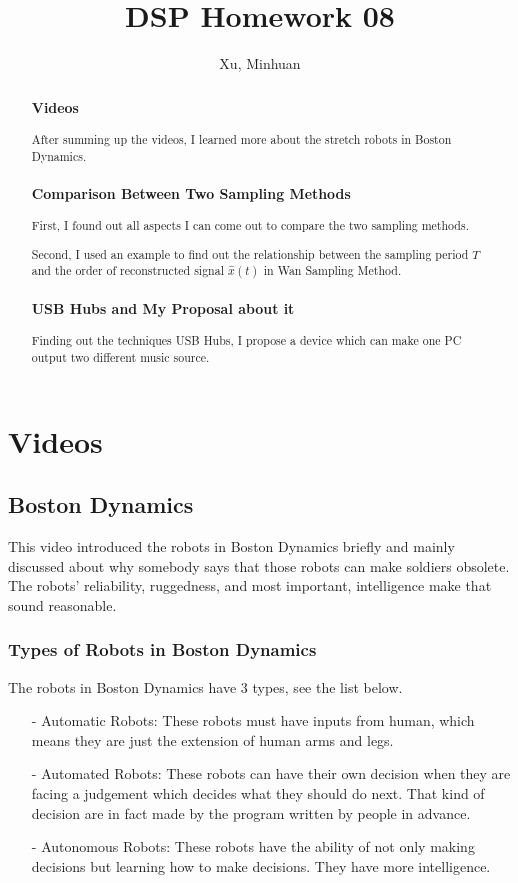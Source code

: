 \documentclass{article}
\begin{document}
\title{DSP Homework 08}
\author{Xu, Minhuan}
\maketitle
\tableofcontents
\begin{abstract}
\subsubsection*{Videos}
After summing up the videos, I learned more about the stretch robots in Boston Dynamics.
\subsubsection*{Comparison Between Two Sampling Methods}
First, I found out all aspects I can come out to compare the two sampling methods.

Second, I used an example to find out the relationship between the sampling period $T$ and the order of reconstructed signal $\hat{x}(t)$ in Wan Sampling Method.
\subsubsection*{USB Hubs and My Proposal about it}
Finding out the techniques USB Hubs, I propose a device which can make one PC output two different music source.

\end{abstract}

\section{Videos}
\subsection{Boston Dynamics}
This video introduced the robots in Boston Dynamics briefly and mainly discussed about why somebody says that those robots can make soldiers obsolete. The robots' reliability, ruggedness, and most important, intelligence make that sound reasonable.

\subsubsection{Types of Robots in Boston Dynamics}

The robots in Boston Dynamics have 3 types, see the list below.
\begin{enumerate}
	\item[-] Automatic Robots: These robots must have inputs from human, which means they are just the extension of human arms and legs.
	\item[-] Automated Robots: These robots can have their own decision when they are facing a judgement which decides what they should do next. That kind of decision are in fact made by the program written by people in advance.
	\item[-] Autonomous Robots: These robots have the ability of not only making decisions but learning how to make decisions. They have more intelligence.
\end{enumerate}
\end{document}
